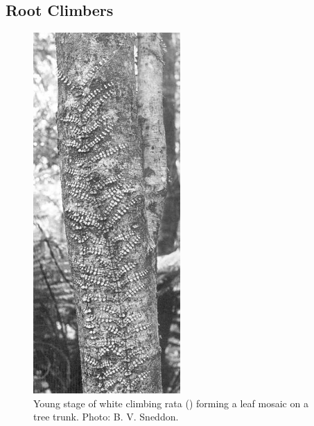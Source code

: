 \subsection{Root Climbers}

\begin{figure}
	\includegraphics[width=0.5\textwidth]{graphics/figure30rata.jpg}
	\centering
	\caption[Young stage of white climbing rata]{Young stage of white climbing rata () forming a leaf mosaic on a tree trunk. Photo: B. V. Sneddon.}%
	\label{fig:30rata}
\end{figure}

